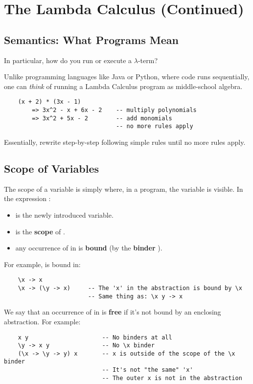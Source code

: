 \documentclass[letterpaper]{article}
\begin{document}
\section{The Lambda Calculus (Continued)}

\subsection{Semantics: What Programs Mean}
In particular, how do you run or execute a $\lambda$-term? 

\bigskip 

Unlike programming languages like Java or Python, where code runs sequentially, one can \emph{think} of running a Lambda Calculus program as middle-school algebra.  
\begin{verbatim}
    (x + 2) * (3x - 1)
        => 3x^2 - x + 6x - 2    -- multiply polynomials
        => 3x^2 + 5x - 2        -- add monomials
                                -- no more rules apply
\end{verbatim}
Essentially, rewrite step-by-step following simple rules until no more rules apply. 

\subsection{Scope of Variables}
The scope of a variable is simply where, in a program, the variable is visible. In the expression :
\begin{itemize}
    \item {} is the newly introduced variable. 
    \item {} is the \textbf{scope} of .
    \item any occurrence of  in  is \textbf{bound} (by the \textbf{binder} ). 
\end{itemize}

For example,  is bound in:
\begin{verbatim}
    \x -> x 
    \x -> (\y -> x)     -- The 'x' in the abstraction is bound by \x 
                        -- Same thing as: \x y -> x
\end{verbatim}

We say that an occurrence of  in  is \textbf{free} if it's not bound by an enclosing abstraction. For example: 
\begin{verbatim}
    x y                     -- No binders at all 
    \y -> x y               -- No \x binder 
    (\x -> \y -> y) x       -- x is outside of the scope of the \x binder
                            -- It's not "the same" 'x'
                            -- The outer x is not in the abstraction 
\end{verbatim}
\end{document}
